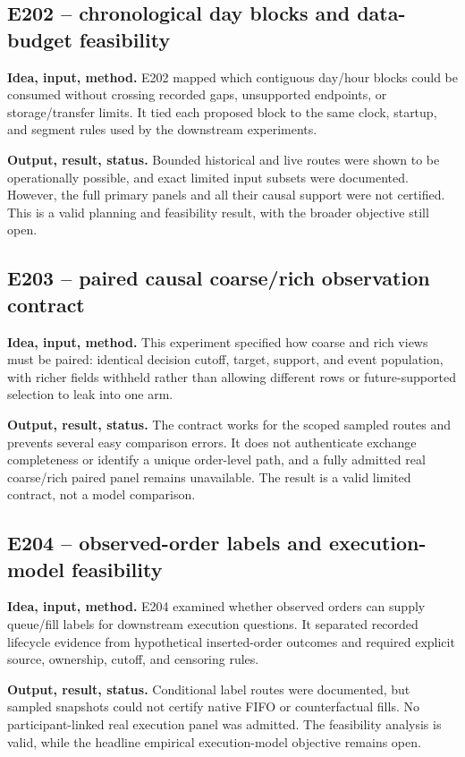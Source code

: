 \documentclass[10pt,a4paper]{article}
\begin{document}
\subsection{E202 -- chronological day blocks and data-budget feasibility}
\textbf{Idea, input, method.} E202 mapped which contiguous day/hour blocks could be consumed without crossing recorded gaps, unsupported endpoints, or storage/transfer limits. It tied each proposed block to the same clock, startup, and segment rules used by the downstream experiments.\par
\textbf{Output, result, status.} Bounded historical and live routes were shown to be operationally possible, and exact limited input subsets were documented. However, the full primary panels and all their causal support were not certified. This is a valid planning and feasibility result, with the broader objective still open.\par
\subsection{E203 -- paired causal coarse/rich observation contract}
\textbf{Idea, input, method.} This experiment specified how coarse and rich views must be paired: identical decision cutoff, target, support, and event population, with richer fields withheld rather than allowing different rows or future-supported selection to leak into one arm.\par
\textbf{Output, result, status.} The contract works for the scoped sampled routes and prevents several easy comparison errors. It does not authenticate exchange completeness or identify a unique order-level path, and a fully admitted real coarse/rich paired panel remains unavailable. The result is a valid limited contract, not a model comparison.\par
\subsection{E204 -- observed-order labels and execution-model feasibility}
\textbf{Idea, input, method.} E204 examined whether observed orders can supply queue/fill labels for downstream execution questions. It separated recorded lifecycle evidence from hypothetical inserted-order outcomes and required explicit source, ownership, cutoff, and censoring rules.\par
\textbf{Output, result, status.} Conditional label routes were documented, but sampled snapshots could not certify native FIFO or counterfactual fills. No participant-linked real execution panel was admitted. The feasibility analysis is valid, while the headline empirical execution-model objective remains open.\par
\end{document}
